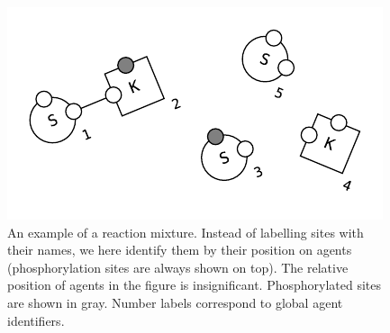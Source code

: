 \begin{figure}[!h]
  \vskip -0.25cm
  \begin{center}
    \includegraphics[scale=0.9]{figures/mixture.pdf}
  \end{center}
  \vskip -0.5cm
  \caption{An example of a reaction mixture. Instead of labelling
    sites with their names, we here identify them by their position on
    agents (phosphorylation sites are always shown on top). The
    relative position of agents in the figure is insignificant.
    Phosphorylated sites are shown in gray.  Number labels correspond
    to global agent identifiers. }
  \label{fig:mixture}
\end{figure}
